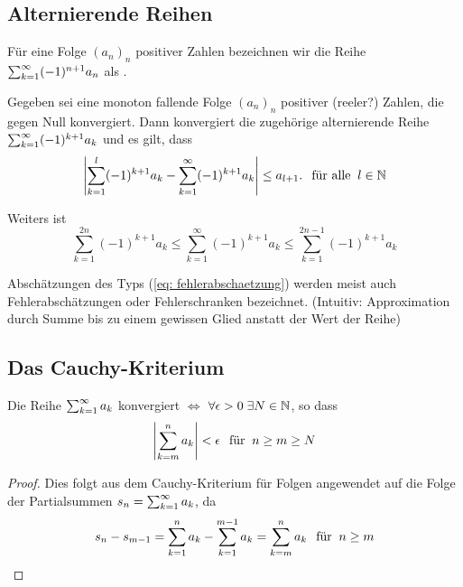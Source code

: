 \subsection{Alternierende Reihen}

Für eine Folge $(a_n)_n$ positiver Zahlen bezeichnen wir die Reihe $\sumkinfty (-1)^{n+1}a_n$ als .

\begin{thm}
	Gegeben sei eine monoton fallende Folge $(a_n)_n$ positiver (reeler?) Zahlen, die gegen Null konvergiert. Dann konvergiert die zugehörige alternierende Reihe $\sumkinfty (-1)^{k+1} a_k$ und es gilt, dass
	\begin{equation}
		\label{eq: fehlerabschaetzung}
		\left | \sumkonetilll (-1)^{k+1} a_k - \sumkinfty (-1)^{k+1} a_k \right | \leq a_{l+1}. \fueralle l\in \nat
	\end{equation}
	
	Weiters ist
	\begin{equation}
		\sum_{k=1}^{2n} (-1)^{k+1} a_k \leq \sum_{k=1}^{\infty} (-1)^{k+1} a_k \leq \sum_{k=1}^{2n-1} (-1)^{k+1}a_k
	\end{equation}
	
	Abschätzungen des Typs (\autoref{eq: fehlerabschaetzung}) werden meist auch Fehlerabschätzungen oder Fehlerschranken bezeichnet. (Intuitiv: Approximation durch Summe bis zu einem gewissen Glied anstatt der Wert der Reihe)
\end{thm}


\subsection{Das Cauchy-Kriterium}

\begin{thm} Die Reihe $\sumkinfty a_k$ konvergiert $\iff$ $\forall \epsilon > 0 \; \exists N \in \nat$, so dass
	\begin{equation}
		\left | \sum_{k=m}^{n} a_k \right | < \epsilon \fuer n \geq m \geq N
	\end{equation}
\end{thm}
\begin{proof}
	Dies folgt aus dem Cauchy-Kriterium für Folgen angewendet auf die Folge der Partialsummen $s_n=\sumkinfty a_k$, da 
	\begin{equation}
				s_n - s_{m-1} = \sum_{k=1}^n a_k - \sum_{k=1}^{m-1} a_k = \sum_{k=m}^n a_k \fuer n \geq m
	\end{equation}
\end{proof}

